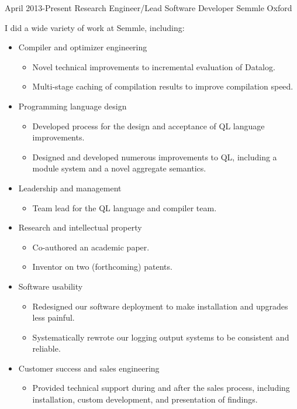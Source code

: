\documentclass[12pt,a4paper,sans]{moderncv}
\begin{document}
\cventry
{April 2013-Present}
{Research Engineer/Lead Software Developer}
{Semmle}
{Oxford}
{}
{
  I did a wide variety of work at Semmle, including:
  \begin{itemize}
  \item Compiler and optimizer engineering
    \begin{itemize}
    \item Novel technical improvements to incremental evaluation of Datalog.
    \item Multi-stage caching of compilation results to improve compilation speed.
    \end{itemize}
  \item Programming language design
    \begin{itemize}
    \item Developed process for the design and acceptance of QL language improvements.
    \item Designed and developed numerous improvements to QL, including a module
      system and a novel aggregate semantics.
    \end{itemize}
  \item Leadership and management
    \begin{itemize}
    \item Team lead for the QL language and compiler team.
    \end{itemize}
  \item Research and intellectual property
    \begin{itemize}
    \item Co-authored an academic paper.
    \item Inventor on two (forthcoming) patents.
    \end{itemize}
  \item Software usability
    \begin{itemize}
    \item Redesigned our software deployment to make installation and
      upgrades less painful.
    \item Systematically rewrote our logging output systems to be consistent and reliable.
    \end{itemize}
  \item Customer success and sales engineering
    \begin{itemize}
    \item Provided technical support during and after the sales process, including
      installation, custom development, and presentation of findings.
    \end{itemize}
  \end{itemize}
}
\end{document}
